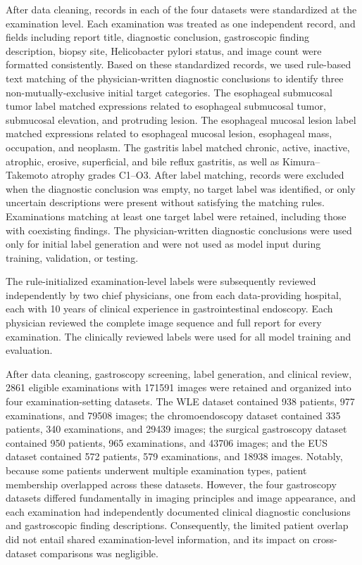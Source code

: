 \documentclass[Afour,sagev,times]{sagej}
\begin{document}
After data cleaning, records in each of the four datasets were standardized at the examination level. Each examination was treated as one independent record, and fields including report title, diagnostic conclusion, gastroscopic finding description, biopsy site, Helicobacter pylori status, and image count were formatted consistently. Based on these standardized records, we used rule-based text matching of the physician-written diagnostic conclusions to identify three non-mutually-exclusive initial target categories. The esophageal submucosal tumor label matched expressions related to esophageal submucosal tumor, submucosal elevation, and protruding lesion. The esophageal mucosal lesion label matched expressions related to esophageal mucosal lesion, esophageal mass, occupation, and neoplasm. The gastritis label matched chronic, active, inactive, atrophic, erosive, superficial, and bile reflux gastritis, as well as Kimura--Takemoto atrophy grades C1--O3. After label matching, records were excluded when the diagnostic conclusion was empty, no target label was identified, or only uncertain descriptions were present without satisfying the matching rules. Examinations matching at least one target label were retained, including those with coexisting findings. The physician-written diagnostic conclusions were used only for initial label generation and were not used as model input during training, validation, or testing.

The rule-initialized examination-level labels were subsequently reviewed independently by two chief physicians, one from each data-providing hospital, each with 10 years of clinical experience in gastrointestinal endoscopy. Each physician reviewed the complete image sequence and full report for every examination. The clinically reviewed labels were used for all model training and evaluation.

After data cleaning, gastroscopy screening, label generation, and clinical review, 2861 eligible examinations with 171591 images were retained and organized into four examination-setting datasets. The WLE dataset contained 938 patients, 977 examinations, and 79508 images; the chromoendoscopy dataset contained 335 patients, 340 examinations, and 29439 images; the surgical gastroscopy dataset contained 950 patients, 965 examinations, and 43706 images; and the EUS dataset contained 572 patients, 579 examinations, and 18938 images. Notably, because some patients underwent multiple examination types, patient membership overlapped across these datasets. However, the four gastroscopy datasets differed fundamentally in imaging principles and image appearance, and each examination had independently documented clinical diagnostic conclusions and gastroscopic finding descriptions. Consequently, the limited patient overlap did not entail shared examination-level information, and its impact on cross-dataset comparisons was negligible.
\end{document}
